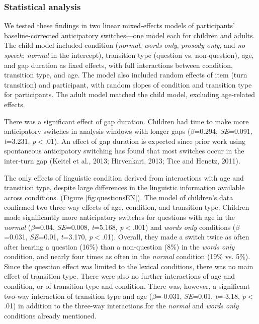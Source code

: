 \documentclass[authoryear, 12pt]{elsarticle}
\begin{document}
\subsubsection{Statistical analysis}

We tested these findings in two linear mixed-effects models of participants' baseline-corrected anticipatory switches---one model each for children and adults. The child model included condition (\textit{normal}, \textit{words only}, \textit{prosody only}, and \textit{no speech}; \textit{normal} in the intercept), transition type (question vs. non-question), age, and gap duration as fixed effects, with full interactions between condition, transition type, and age. The model also included random effects of item (turn transition) and participant, with random slopes of condition and transition type for participants. The adult model matched the child model, excluding age-related effects.

There was a significant effect of gap duration. Children had time to make more anticipatory switches in analysis windows with longer gaps (\textit{$\beta$}=0.294, \textit{SE}=0.091, \textit{t}=3.231, \textit{p}$<$.01). An effect of gap duration is expected since prior work using spontaneous anticipatory switching has found that most switches occur in the inter-turn gap (Keitel et al., 2013; Hirvenkari, 2013; Tice and Henetz, 2011).

The only effects of linguistic condition derived from interactions with age and transition type, despite large differences in the linguistic information available across conditions. (Figure \ref{fig:questionsEN}). The model of children's data confirmed two three-way effects of age, condition, and transition type. Children made significantly more anticipatory switches for questions with age in the \textit{normal} (\textit{$\beta$}=0.04, \textit{SE}=0.008, \textit{t}=5.168, \textit{p}$<$.001) and \textit{words only} conditions (\textit{$\beta$}=0.031, \textit{SE}=0.01, \textit{t}=3.170, \textit{p}$<$.01). Overall, they made a switch twice as often after hearing a question (16\%) than a non-question (8\%) in the \textit{words only} condition, and nearly four times as often in the \textit{normal} condition (19\% vs. 5\%). Since the question effect was limited to the lexical conditions, there was no main effect of transition type. There were also no further interactions of age and condition, or of transition type and condition. There was, however, a significant two-way interaction of transition type and age (\textit{$\beta$}=-0.031, \textit{SE}=0.01, \textit{t}=-3.18, \textit{p}$<$.01) in addition to the three-way interactions for the \textit{normal} and \textit{words only} conditions already mentioned.
\end{document}
